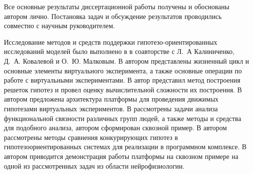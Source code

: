 {\contribution} 
Все основные результаты диссертационной работы получены и обоснованы автором лично. 
Постановка задач и обсуждение результатов проводились совместно с научным руководителем. 

Исследование методов и средств поддержки гипотезо-ориентированных исследований моделей было выполнено в
\cite{kalinichenko2015methods} в соавторстве с Л.~А Калиниченко, Д.~А. Ковалевой и О.~Ю. Малковым.
В \cite{kovalev2017organization, kovalev2019virtual} автором представлены жизненный цикл и основные элементы 
виртуального эксперимента, а также основные операции по работе с виртуальными экспериментами. 
В \cite{kovalev2019constructing} автор представил метод построения решеток гипотез и провел оценку вычислительной сложности 
их построения. 
В \cite{kovalev2020architecture} автором предложена архитектура платформы для проведения движимых гипотезами 
виртуальных экспериментов. 
В \cite{kovalev2017search, kovalev2020multidisciplinary, kovalev2020methods} рассмотрены задачи анализа 
функциональной связности различных групп людей, а также методы и средства для подобного анализа, автором сформирован 
сквозной пример. 
В \cite{tirikov2021methods} автором рассмотрены методы сравнения конкурирующих гипотез 
в гипотезоориентированных системах для реализации в программном комплексе.
В \cite{} автором приводится демонстрация работы платформы на сквозном примере на одной из рассмотренных задач из 
области нейрофизиологии.


